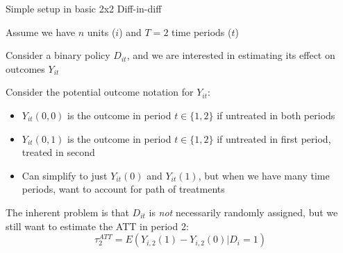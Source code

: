 \documentclass[notes,11pt, aspectratio=169]{beamer}
\newenvironment{wideitemize}{\itemize\addtolength{\itemsep}{10pt}}{\enditemize}
\begin{document}
\begin{frame}{Simple setup in basic 2x2 Diff-in-diff }
	\begin{wideitemize}
		\item Assume we have $n$ units ($i$) and $T=2$ time periods ($t$)
		\item Consider a binary policy $D_{it}$, and we are interested
		in estimating its effect on outcomes $Y_{it}$
		\item Consider the potential outcome notation for $Y_{it}$:
		\begin{itemize}
			\item $Y_{it}(0,0)$ is the outcome in period $t\in \{1,2\}$ if untreated in both periods
			\item $Y_{it}(0,1)$ is the outcome in period $t\in \{1,2\}$ if
			      untreated in first period, treated in second
			\item Can simplify to just $Y_{it}(0)$ and $Y_{it}(1)$, but when
			      we have many time periods, want to account for path of treatments
		\end{itemize}
		\item The inherent problem is that $D_{it}$ is \emph{not}
		necessarily randomly assigned, but we still want to estimate the ATT in period 2:
		\begin{equation*}
			\tau_{2}^{ATT} = E(Y_{i,2}(1) - Y_{i,2}(0) | D_{i} = 1)
		\end{equation*}
	\end{wideitemize}
\end{frame}
\end{document}
